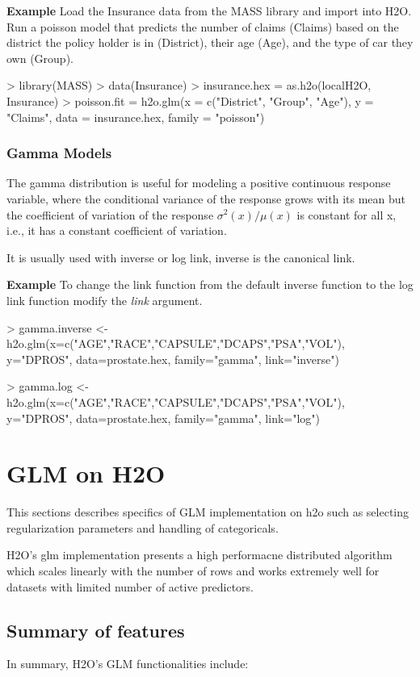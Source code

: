 \documentclass[11pt]{article}
\begin{document}
\textbf{Example}
Load the Insurance data from the MASS library and import into H2O. Run a poisson model that predicts the number of claims (Claims) based on the district the policy holder is in (District), their age (Age), and the type of car they own (Group).
\begin{spverbatim}
> library(MASS)
> data(Insurance)
> insurance.hex = as.h2o(localH2O, Insurance)
> poisson.fit = h2o.glm(x = c("District", "Group", "Age"), y = "Claims", data = insurance.hex, family = "poisson")
\end{spverbatim}

\subsubsection{Gamma Models}
The gamma distribution is useful for modeling a positive continuous response variable, where the conditional variance of the response grows with its mean but  the coefficient of variation of the response $\sigma^2(x)/μ(x)$ is constant for all x,  i.e., it has a constant coefficient of variation.

It is usually used with inverse or log link, inverse is the canonical link.

\textbf{Example}
To change the link function from the default inverse function to the log link function modify the \textit{link} argument.

\begin{spverbatim}
> gamma.inverse <- h2o.glm(x=c("AGE","RACE","CAPSULE","DCAPS","PSA","VOL"), y="DPROS", data=prostate.hex, family="gamma", link="inverse")

> gamma.log <- h2o.glm(x=c("AGE","RACE","CAPSULE","DCAPS","PSA","VOL"), y="DPROS", data=prostate.hex, family="gamma", link="log")
\end{spverbatim}



\section{GLM on H2O}
This sections describes specifics of GLM implementation on h2o such as selecting regularization parameters and handling of categoricals. 

H2O's glm implementation presents a high performacne distributed algorithm which scales linearly with the number of rows and works extremely well for datasets with limited number of active predictors. 

\subsection{Summary of features} 
In summary, H2O's GLM functionalities include:
\end{document}
